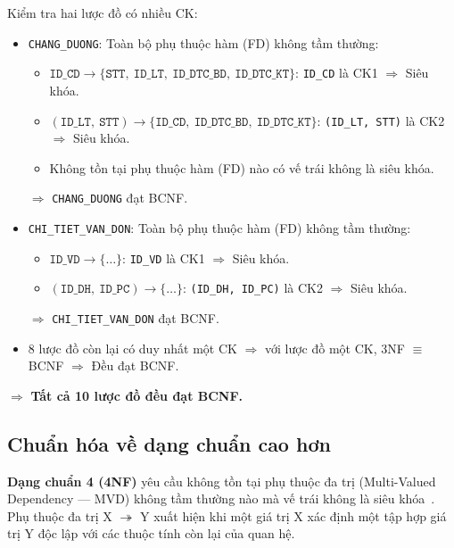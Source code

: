 \documentclass[11pt]{report}
\begin{document}
Kiểm tra hai lược đồ có nhiều CK:
\begin{itemize}
    \item \texttt{CHANG\_DUONG}: Toàn bộ phụ thuộc hàm (FD) không tầm thường:
    \begin{itemize}
        \item $\texttt{ID\_CD} \to \{\texttt{STT},\ \texttt{ID\_LT},\ \texttt{ID\_DTC\_BD},\ \texttt{ID\_DTC\_KT}\}$: \texttt{ID\_CD} là CK1 $\Rightarrow$ Siêu khóa. 
        
        \item $(\texttt{ID\_LT},\ \texttt{STT}) \to \{\texttt{ID\_CD},\ \texttt{ID\_DTC\_BD},\ \texttt{ID\_DTC\_KT}\}$: \texttt{(ID\_LT, STT)} là CK2 $\Rightarrow$ Siêu khóa. 
        
        \item Không tồn tại phụ thuộc hàm (FD) nào có vế trái không là siêu khóa.
    \end{itemize}
    $\Rightarrow$ \texttt{CHANG\_DUONG} đạt BCNF.

    \item \texttt{CHI\_TIET\_VAN\_DON}: Toàn bộ phụ thuộc hàm (FD) không tầm thường:
    \begin{itemize}
        \item $\texttt{ID\_VD} \to \{\ldots\}$: \texttt{ID\_VD} là CK1 $\Rightarrow$ Siêu khóa. 
        
        \item $(\texttt{ID\_DH},\ \texttt{ID\_PC}) \to \{\ldots\}$: \texttt{(ID\_DH, ID\_PC)} là CK2 $\Rightarrow$ Siêu khóa. 
    \end{itemize}
    $\Rightarrow$ \texttt{CHI\_TIET\_VAN\_DON} đạt BCNF.

    \item 8 lược đồ còn lại có duy nhất một CK $\Rightarrow$ với lược đồ một CK, 3NF $\equiv$ BCNF $\Rightarrow$ Đều đạt BCNF.
\end{itemize}

$\Rightarrow$ \textbf{Tất cả 10 lược đồ đều đạt BCNF.}

\subsection{Chuẩn hóa về dạng chuẩn cao hơn}
\label{subsec:dang_chuan_cao_hon}

\textbf{Dạng chuẩn 4 (4NF)} yêu cầu không tồn tại phụ thuộc đa trị (Multi-Valued Dependency --- MVD) không tầm thường nào mà vế trái không là siêu khóa~\cite{elmasri2015fundamentals}. Phụ thuộc đa trị X $\twoheadrightarrow$ Y xuất hiện khi một giá trị X xác định một tập hợp giá trị Y độc lập với các thuộc tính còn lại của quan hệ.
\end{document}
